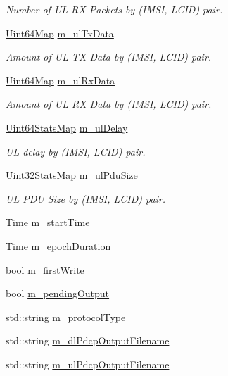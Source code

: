 \begin{DoxyCompactItemize}
\begin{DoxyCompactList}\small\item\em Number of UL RX Packets by (I\+M\+SI, L\+C\+ID) pair. \end{DoxyCompactList}\item 
\hyperlink{namespacens3_a02246d7bb546e26a989e837a36d17797}{Uint64\+Map} \hyperlink{classns3_1_1RadioBearerStatsCalculator_a4aae728361dc1b759486f716f3aab62e}{m\+\_\+ul\+Tx\+Data}
\begin{DoxyCompactList}\small\item\em Amount of UL TX Data by (I\+M\+SI, L\+C\+ID) pair. \end{DoxyCompactList}\item 
\hyperlink{namespacens3_a02246d7bb546e26a989e837a36d17797}{Uint64\+Map} \hyperlink{classns3_1_1RadioBearerStatsCalculator_a22eb05c62aff48ca9def716ce945823c}{m\+\_\+ul\+Rx\+Data}
\begin{DoxyCompactList}\small\item\em Amount of UL RX Data by (I\+M\+SI, L\+C\+ID) pair. \end{DoxyCompactList}\item 
\hyperlink{namespacens3_a302499faee8d6f35953a73b52b34c421}{Uint64\+Stats\+Map} \hyperlink{classns3_1_1RadioBearerStatsCalculator_a1e34e4a6f1f27c5df8076826ab2e9a6b}{m\+\_\+ul\+Delay}
\begin{DoxyCompactList}\small\item\em UL delay by (I\+M\+SI, L\+C\+ID) pair. \end{DoxyCompactList}\item 
\hyperlink{namespacens3_a024aec20f35b29a93b5bfcaacf8ce269}{Uint32\+Stats\+Map} \hyperlink{classns3_1_1RadioBearerStatsCalculator_a5894673416a2a7c37ef1ec8295997575}{m\+\_\+ul\+Pdu\+Size}
\begin{DoxyCompactList}\small\item\em UL P\+DU Size by (I\+M\+SI, L\+C\+ID) pair. \end{DoxyCompactList}\item 
\hyperlink{classns3_1_1Time}{Time} \hyperlink{classns3_1_1RadioBearerStatsCalculator_a421041c2860801f4b5f9aa55869755c6}{m\+\_\+start\+Time}
\item 
\hyperlink{classns3_1_1Time}{Time} \hyperlink{classns3_1_1RadioBearerStatsCalculator_ac510d632d9e9bafa59a07df7674ba7de}{m\+\_\+epoch\+Duration}
\item 
bool \hyperlink{classns3_1_1RadioBearerStatsCalculator_aa70fad319972ebea7e1fba266efdaf6a}{m\+\_\+first\+Write}
\item 
bool \hyperlink{classns3_1_1RadioBearerStatsCalculator_aeb0fc0f587b9d6e55e8e37de4cdb4059}{m\+\_\+pending\+Output}
\item 
std\+::string \hyperlink{classns3_1_1RadioBearerStatsCalculator_a04e3362d2cfc3b03fa417696a45f58e3}{m\+\_\+protocol\+Type}
\item 
std\+::string \hyperlink{classns3_1_1RadioBearerStatsCalculator_a7303f2638298ef3080b41acd5388000b}{m\+\_\+dl\+Pdcp\+Output\+Filename}
\item 
std\+::string \hyperlink{classns3_1_1RadioBearerStatsCalculator_a980a7ee46cf29b2710f6cd1f73de9636}{m\+\_\+ul\+Pdcp\+Output\+Filename}
\end{DoxyCompactItemize}
